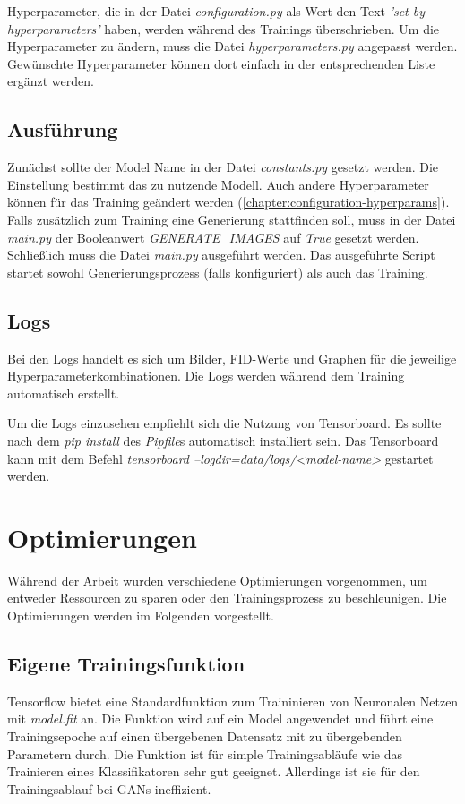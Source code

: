 Hyperparameter, die in der Datei \textit{configuration.py} als Wert den Text \textit{'set by hyperparameters'} haben, werden während des Trainings überschrieben.
Um die Hyperparameter zu ändern, muss die Datei \textit{hyperparameters.py} angepasst werden.
Gewünschte Hyperparameter können dort einfach in der entsprechenden Liste ergänzt werden.

\subsection{Ausführung}
Zunächst sollte der Model Name in der Datei \textit{constants.py} gesetzt werden.
Die Einstellung bestimmt das zu nutzende Modell.
Auch andere Hyperparameter können für das Training geändert werden (\cref{chapter:configuration-hyperparams}).
Falls zusätzlich zum Training eine Generierung stattfinden soll, muss in der Datei \textit{main.py} der Booleanwert \textit{GENERATE\_IMAGES} auf \textit{True} gesetzt werden.
Schließlich muss die Datei \textit{main.py} ausgeführt werden.
Das ausgeführte Script startet sowohl Generierungsprozess (falls konfiguriert) als auch das Training.

\subsection{Logs}
Bei den Logs handelt es sich um Bilder, FID-Werte und Graphen für die jeweilige Hyperparameterkombinationen.
Die Logs werden während dem Training automatisch erstellt.

Um die Logs einzusehen empfiehlt sich die Nutzung von Tensorboard.
Es sollte nach dem \textit{pip install} des \textit{Pipfile}s automatisch installiert sein.
Das Tensorboard kann mit dem Befehl \textit{tensorboard --logdir=data/logs/<model-name>} gestartet werden.

\section{Optimierungen}
Während der Arbeit wurden verschiedene Optimierungen vorgenommen, um entweder Ressourcen zu sparen oder den Trainingsprozess zu beschleunigen.
Die Optimierungen werden im Folgenden vorgestellt.

\subsection{Eigene Trainingsfunktion}
Tensorflow bietet eine Standardfunktion zum Traininieren von Neuronalen Netzen mit \textit{model.fit} an.
Die Funktion wird auf ein Model angewendet und führt eine Trainingsepoche auf einen übergebenen Datensatz mit zu übergebenden Parametern durch.
Die Funktion ist für simple Trainingsabläufe wie das Trainieren eines Klassifikatoren sehr gut geeignet.
Allerdings ist sie für den Trainingsablauf bei GANs ineffizient.
\newline

